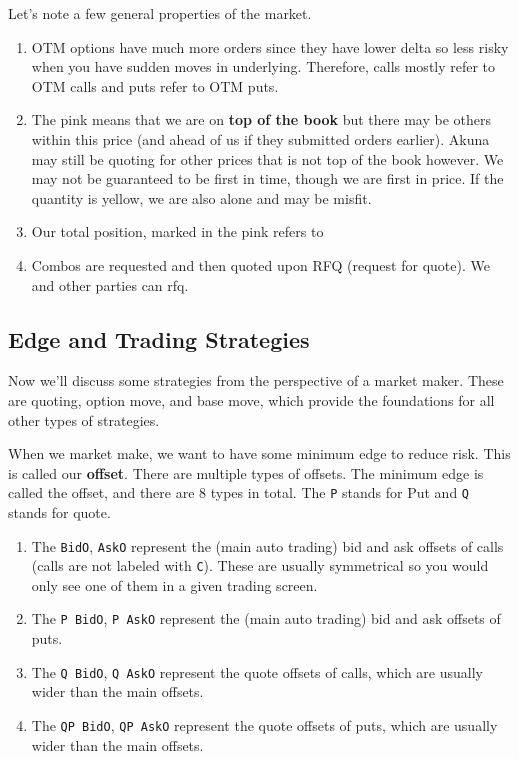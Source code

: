\documentclass{article}
\begin{document}
    Let's note a few general properties of the market. 
    \begin{enumerate}
      \item OTM options have much more orders since they have lower delta so less risky when you have sudden moves in underlying. Therefore, calls mostly refer to OTM calls and puts refer to OTM puts. 

      \item The pink means that we are on \textbf{top of the book} but there may be others within this price (and ahead of us if they submitted orders earlier). Akuna may still be quoting for other prices that is not top of the book however. We may not be guaranteed to be first in time, though we are first in price. If the quantity is yellow, we are also alone and may be misfit.

      \item Our total position, marked in the pink refers to 
      \item Combos are requested and then quoted upon RFQ (request for quote). We and other parties can rfq. 
    \end{enumerate}

  \subsection{Edge and Trading Strategies}

    Now we'll discuss some strategies from the perspective of a market maker. These are quoting, option move, and base move, which provide the foundations for all other types of strategies.

    \begin{definition}[Offset]
      When we market make, we want to have some minimum edge to reduce risk. This is called our \textbf{offset}. There are multiple types of offsets. 
      The minimum edge is called the offset, and there are 8 types in total. The \texttt{P} stands for Put and \texttt{Q} stands for quote.
      \begin{enumerate}
        \item The \texttt{BidO}, \texttt{AskO} represent the (main auto trading) bid and ask offsets of calls (calls are not labeled with \texttt{C}). These are usually symmetrical so you would only see one of them in a given trading screen.
        \item The \texttt{P BidO}, \texttt{P AskO} represent the (main auto trading) bid and ask offsets of puts.
        \item The \texttt{Q BidO}, \texttt{Q AskO} represent the quote offsets of calls, which are usually wider than the main offsets.
        \item The \texttt{QP BidO}, \texttt{QP AskO} represent the quote offsets of puts, which are usually wider than the main offsets.
      \end{enumerate}
    \end{definition}
\end{document}
